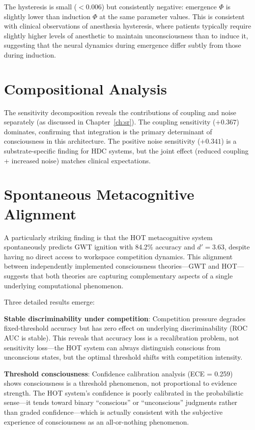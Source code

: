 \documentclass[12pt]{book}
\begin{document}
The hysteresis is small ($< 0.006$) but consistently negative: emergence $\Phi$ is slightly lower than induction $\Phi$ at the same parameter values. This is consistent with clinical observations of anesthesia hysteresis, where patients typically require slightly higher levels of anesthetic to maintain unconsciousness than to induce it, suggesting that the neural dynamics during emergence differ subtly from those during induction.

\section{Compositional Analysis}

The sensitivity decomposition reveals the contributions of coupling and noise separately (as discussed in Chapter~\ref{ch:sr}). The coupling sensitivity ($+0.367$) dominates, confirming that integration is the primary determinant of consciousness in this architecture. The positive noise sensitivity ($+0.341$) is a substrate-specific finding for HDC systems, but the joint effect (reduced coupling + increased noise) matches clinical expectations.

\section{Spontaneous Metacognitive Alignment}

A particularly striking finding is that the HOT metacognitive system spontaneously predicts GWT ignition with 84.2\% accuracy and $d' = 3.63$, despite having no direct access to workspace competition dynamics. This alignment between independently implemented consciousness theories---GWT and HOT---suggests that both theories are capturing complementary aspects of a single underlying computational phenomenon.

Three detailed results emerge:

\textbf{Stable discriminability under competition}: Competition pressure degrades fixed-threshold accuracy but has zero effect on underlying discriminability (ROC AUC is stable). This reveals that accuracy loss is a recalibration problem, not sensitivity loss---the HOT system can always distinguish conscious from unconscious states, but the optimal threshold shifts with competition intensity.

\textbf{Threshold consciousness}: Confidence calibration analysis (ECE = 0.259) shows consciousness is a threshold phenomenon, not proportional to evidence strength. The HOT system's confidence is poorly calibrated in the probabilistic sense---it tends toward binary ``conscious'' or ``unconscious'' judgments rather than graded confidence---which is actually consistent with the subjective experience of consciousness as an all-or-nothing phenomenon.
\end{document}
